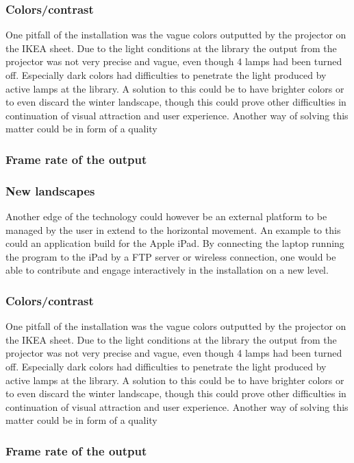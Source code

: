 \subsubsection{Colors/contrast}
One pitfall of the installation was the vague colors outputted by the projector on the IKEA sheet. Due to the light conditions at the library the output from the projector was not very precise and vague, even though 4 lamps had been turned off. Especially dark colors had difficulties to penetrate the light produced by active lamps at the library. A solution to this could be to have brighter colors or to even discard the winter landscape, though this could prove other difficulties in continuation of visual attraction and user experience. Another way of solving this matter could be in form of a quality 
\subsubsection{Frame rate of the output}
\subsubsection{New landscapes}  
Another edge of the technology could however be an external platform to be managed by the user in extend to the horizontal movement. An example to this could an application build for the Apple iPad. By connecting the laptop running the program to the iPad by a FTP server or wireless connection, one would be able to contribute and engage interactively in the installation on a new level.

\subsubsection{Colors/contrast}
One pitfall of the installation was the vague colors outputted by the projector on the IKEA sheet. Due to the light conditions at the library the output from the projector was not very precise and vague, even though 4 lamps had been turned off. Especially dark colors had difficulties to penetrate the light produced by active lamps at the library. A solution to this could be to have brighter colors or to even discard the winter landscape, though this could prove other difficulties in continuation of visual attraction and user experience. Another way of solving this matter could be in form of a quality 
\subsubsection{Frame rate of the output}
